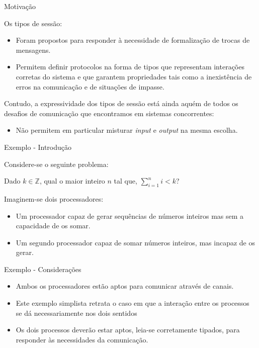 \lstset{language=freest, numbers=none, escapeinside=||}

\begin{frame}[fragile]{Motivação}

  Os tipos de sessão:
  \begin{itemize}
  \item Foram propostos para responder à necessidade de formalização de trocas de mensagens.
  \item Permitem definir protocolos na forma de tipos que representam interações corretas do sistema e que garantem propriedades tais como a inexistência de erros na comunicação e de situações de impasse.
  \end{itemize}
  Contudo, a expressividade dos tipos de sessão está ainda aquém de todos os desafios de comunicação que encontramos em sistemas concorrentes:
  \begin{itemize}
  \item Não permitem em particular misturar \textit{input} e \textit{output} na mesma escolha.
  \end{itemize}
\end{frame}

\begin{frame}[fragile]{Exemplo - Introdução}

  Considere-se o seguinte problema:
  
  Dado $k \in \mathbb{Z}$, qual o maior inteiro $n$ tal que, $\sum_{i=1}^{n} i < k$?

  Imaginem-se dois processadores:
  \begin{itemize}
  \item Um processador capaz de gerar sequências de números inteiros mas sem a capacidade de os somar.
  \item Um segundo processador capaz de somar números inteiros, mas incapaz de os gerar.
  \end{itemize}  
\end{frame}

\begin{frame}{Exemplo - Considerações}
  \begin{itemize}
  \item Ambos os processadores estão aptos para comunicar através de canais.
    \vspace*{2mm}
  \item Este exemplo simplista retrata o caso em que a interação entre os processos se dá necessariamente nos dois sentidos
    \vspace*{5mm}
  \item Os dois processos deverão estar aptos, leia-se corretamente tipados, para responder às necessidades da comunicação.
  \end{itemize}
\end{frame}


